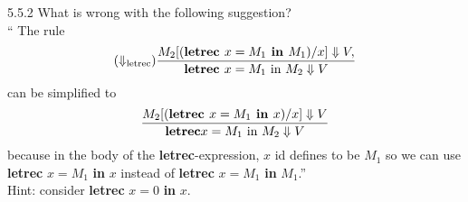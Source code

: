 \begin{exercise}{5.5.2}
What is wrong with the following suggestion?
\\
`` The rule 
\[(\Downarrow_{\text{letrec}})
\frac
{M_2[(\text{\textbf{letrec }} x = M_1 \text{\textbf{ in }} M_1)/x] \Downarrow  V, }
{\text{\textbf{letrec }} x = M_1 \text{ in } M_2 \Downarrow  V}
\]
can be simplified to 
\[\frac
{M_2[(\text{\textbf{letrec }} x = M_1 \text{\textbf{ in }} x)/x]\Downarrow V}
{\text{\textbf{letrec}} x = M_1 \text{ in } M_2 \Downarrow  V}
\]
because in the body of the \textbf{letrec}-expression, $x$ id defines to be $M_1$ so we can use \textbf{letrec} $x=M_1$ \textbf{in} $x$ instead of \textbf{letrec} $x = M_1$ \textbf{in} $M_1$.''
\\
Hint: consider \textbf{letrec} $x=0$ \textbf{in} $x$.
\\
\end{exercise}

